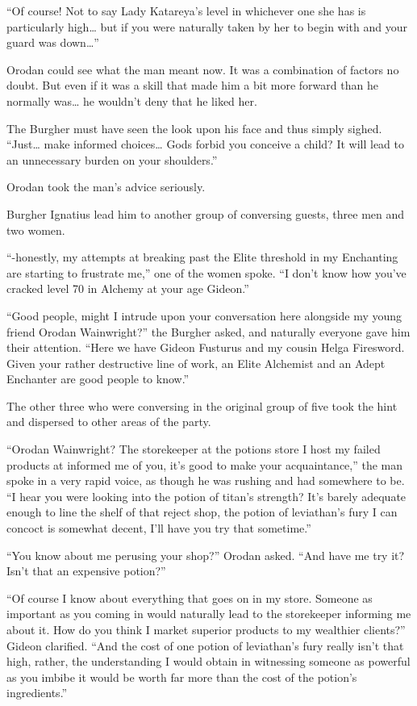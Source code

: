 \documentclass[a4paper,10pt]{book}
\begin{document}
“Of course! Not to say Lady Katareya’s level in whichever one she has is particularly high… but if you were naturally taken by her to begin with and your guard was down…”\par
Orodan could see what the man meant now. It was a combination of factors no doubt. But even if it was a skill that made him a bit more forward than he normally was… he wouldn’t deny that he liked her.\par
The Burgher must have seen the look upon his face and thus simply sighed. “Just… make informed choices… Gods forbid you conceive a child? It will lead to an unnecessary burden on your shoulders.”\par
Orodan took the man’s advice seriously.\par
Burgher Ignatius lead him to another group of conversing guests, three men and two women.\par
“-honestly, my attempts at breaking past the Elite threshold in my Enchanting are starting to frustrate me,” one of the women spoke. “I don’t know how you’ve cracked level 70 in Alchemy at your age Gideon.”\par
“Good people, might I intrude upon your conversation here alongside my young friend Orodan Wainwright?” the Burgher asked, and naturally everyone gave him their attention. “Here we have Gideon Fusturus and my cousin Helga Firesword. Given your rather destructive line of work, an Elite Alchemist and an Adept Enchanter are good people to know.”\par
The other three who were conversing in the original group of five took the hint and dispersed to other areas of the party.\par
“Orodan Wainwright? The storekeeper at the potions store I host my failed products at informed me of you, it’s good to make your acquaintance,” the man spoke in a very rapid voice, as though he was rushing and had somewhere to be. “I hear you were looking into the potion of titan’s strength? It’s barely adequate enough to line the shelf of that reject shop, the potion of leviathan’s fury I can concoct is somewhat decent, I’ll have you try that sometime.”\par
“You know about me perusing your shop?” Orodan asked. “And have me try it? Isn’t that an expensive potion?”\par
“Of course I know about everything that goes on in my store. Someone as important as you coming in would naturally lead to the storekeeper informing me about it. How do you think I market superior products to my wealthier clients?” Gideon clarified. “And the cost of one potion of leviathan’s fury really isn’t that high, rather, the understanding I would obtain in witnessing someone as powerful as you imbibe it would be worth far more than the cost of the potion’s ingredients.”\par
\end{document}
